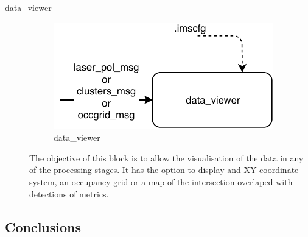 \begin{description}
\item[data\_viewer] \hfill
\begin{figure}[ht!]
\centering
\includegraphics[scale=1]{fig/3/data_viewer.pdf}
\caption{data\_viewer}
\label{data_viewer}
\end{figure}

The objective of this block is to allow the visualisation of the data in any of the processing stages. It has the option to display and XY coordinate system, an occupancy grid or a map of the intersection overlaped with detections of metrics.

\end{description}

\subsection{Conclusions}